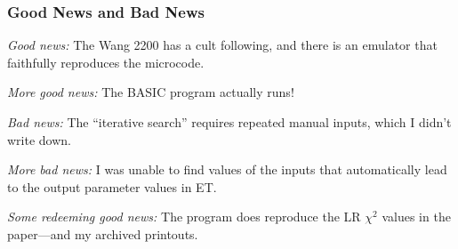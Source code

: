 \begin{frame}
    \frametitle{Good News and Bad News}
	\emph{Good news:}  The Wang 2200 has a cult following, and there is an emulator that faithfully reproduces the microcode.
	
	\bigskip
	\emph{More good news:}  The BASIC program actually runs!
	
	\bigskip
	\emph{Bad news:} The ``iterative search'' requires repeated manual inputs, which I didn't write down.
	
	\bigskip
	\emph{More bad news:} I was unable to find values of the inputs that automatically lead to the output parameter values in ET.
	
	\bigskip
	\emph{Some redeeming good news:} The program does reproduce the LR $\chi^2$ values in the paper---and my archived printouts.
\end{frame}
